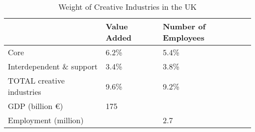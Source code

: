 \begin{table}[h]
\centering
\begin{tabular}{lll}
                              & Value Added & Number of Employees \\
\hline
Core                          & 6.2\%       & 5.4\% \\
Interdependent \& support     & 3.4\%       & 3.8\% \\
TOTAL creative industries     & 9.6\%       & 9.2\% \\
GDP (billion \euro)           & 175         &       \\
Employment (million)          &             & 2.7   \\
\end{tabular}
\caption{Weight of Creative Industries in the UK \citep[Table 5]{tera2010}}
\label{table:creativeindustryweight}
\end{table}